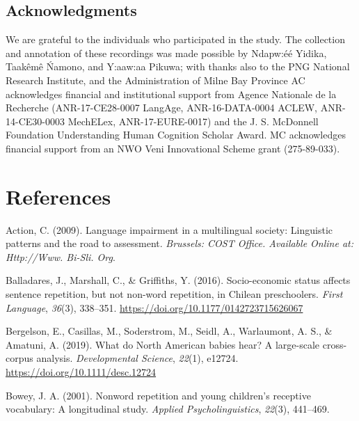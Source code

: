 \documentclass[english,,man,floatsintext]{apa6}
\begin{document}
\newpage

\hypertarget{acknowledgments}{%
\subsection{Acknowledgments}\label{acknowledgments}}

We are grateful to the individuals who participated in the study. The collection and annotation of these recordings was made possible by Ndapw:éé Yidika, Taakêmê Ńamono, and Y:aaw:aa Pikuwa; with thanks also to the PNG National Research Institute, and the Administration of Milne Bay Province AC acknowledges financial and institutional support from Agence Nationale de la Recherche (ANR-17-CE28-0007 LangAge, ANR-16-DATA-0004 ACLEW, ANR-14-CE30-0003 MechELex, ANR-17-EURE-0017) and the J. S. McDonnell Foundation Understanding Human Cognition Scholar Award. MC acknowledges financial support from an NWO Veni Innovational Scheme grant (275-89-033).

\hypertarget{references}{%
\section{References}\label{references}}

\setlength{\parindent}{-0.5in}
\setlength{\leftskip}{0.5in}

\hypertarget{refs}{}
\leavevmode\hypertarget{ref-is08042009language}{}%
Action, C. (2009). Language impairment in a multilingual society: Linguistic patterns and the road to assessment. \emph{Brussels: COST Office. Available Online at: Http://Www. Bi-Sli. Org}.

\leavevmode\hypertarget{ref-balladares2016socio}{}%
Balladares, J., Marshall, C., \& Griffiths, Y. (2016). Socio-economic status affects sentence repetition, but not non-word repetition, in Chilean preschoolers. \emph{First Language}, \emph{36}(3), 338--351. \url{https://doi.org/10.1177/0142723715626067}

\leavevmode\hypertarget{ref-bergelsoncasillas2019what}{}%
Bergelson, E., Casillas, M., Soderstrom, M., Seidl, A., Warlaumont, A. S., \& Amatuni, A. (2019). What do North American babies hear? A large-scale cross-corpus analysis. \emph{Developmental Science}, \emph{22}(1), e12724. \url{https://doi.org/10.1111/desc.12724}

\leavevmode\hypertarget{ref-bowey2001nonword}{}%
Bowey, J. A. (2001). Nonword repetition and young children's receptive vocabulary: A longitudinal study. \emph{Applied Psycholinguistics}, \emph{22}(3), 441--469.
\end{document}
